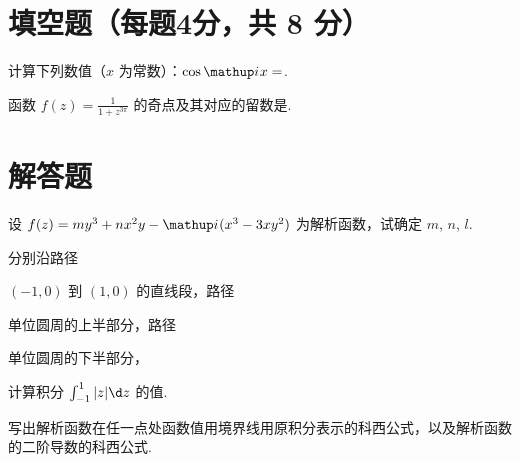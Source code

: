 \documentclass[quiet]{ctexart}
\begin{document}
\section{填空题（每题4分，共 8 分）}

\begin{problem}
  计算下列数值（$x$ 为常数）：$\cos\iu x = $\result{}.
\end{problem}
\begin{solution}
  
\end{solution}

\begin{problem}
  函数 $f(z) = \frac{1}{1 + z^{3\pi}}$ 的奇点及其对应的留数是\result{}.
\end{problem}
\begin{solution}
  
\end{solution}

\section{解答题}

\begin{problem}[本题 8 分]
  设 $f(z) = my^3 + nx^2y - \iu(x^3 - 3xy^2)$ 为解析函数，试确定 $m$, $n$, $l$.
\end{problem}
\begin{solution}
  
\end{solution}

\begin{problem}[本题 10 分]
  分别沿路径\begin{enumerate*}
    \item $(-1,0)$ 到 $(1,0)$ 的直线段，路径
    \item 单位圆周的上半部分，路径
    \item 单位圆周的下半部分，
  \end{enumerate*}
  计算积分 $\int_{-1}^1|z| \d z$ 的值.
\end{problem}
\begin{solution}
  
\end{solution}

\begin{problem}[本题 4 分]
  写出解析函数在任一点处函数值用境界线用原积分表示的科西公式，以及解析函数的二阶导数的科西公式.
\end{problem}
\begin{solution}
  
\end{solution}
\end{document}
